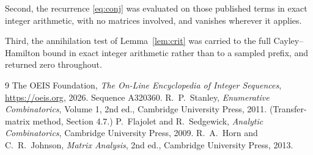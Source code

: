 \documentclass[11pt,a4paper]{article}
\theoremstyle{plain}
\theoremstyle{definition}
\begin{document}
Second, the recurrence \eqref{eq:conj} was evaluated on those published terms in exact
integer arithmetic, with no matrices involved, and vanishes wherever it applies.

Third, the annihilation test of Lemma~\ref{lem:crit} was carried to the full
Cayley--Hamilton bound in exact integer arithmetic rather than to a sampled prefix, and
returned zero throughout.

\begin{thebibliography}{9}
 The OEIS Foundation, \emph{The On-Line Encyclopedia of Integer
Sequences}, \url{https://oeis.org}, 2026. Sequence A320360.
 R.~P.~Stanley, \emph{Enumerative Combinatorics}, Volume 1, 2nd ed.,
Cambridge University Press, 2011. (Transfer-matrix method, Section 4.7.)
 P.~Flajolet and R.~Sedgewick, \emph{Analytic Combinatorics}, Cambridge
University Press, 2009.
 R.~A.~Horn and C.~R.~Johnson, \emph{Matrix Analysis}, 2nd ed., Cambridge
University Press, 2013.
\end{thebibliography}
\end{document}
